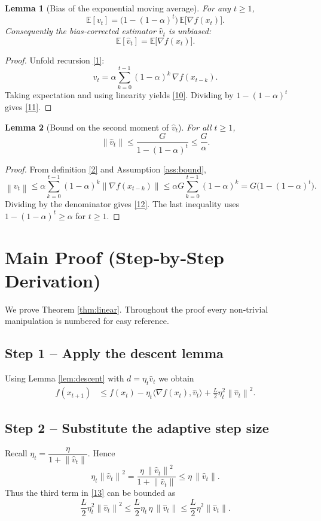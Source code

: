 \documentclass{article}
\newtheorem{lemma}{Lemma}
\newcommand{\EE}{\mathbb{E}}
\newcommand{\norm}[1]{\left\|#1\right\|}
\newcommand{\inner}[2]{\langle #1,#2\rangle}
\newcommand{\grad}{\nabla}
\begin{document}
\begin{lemma}[Bias of the exponential moving average]\label{lem:bias}
For any $t\ge1$,
\[
\EE[v_{t}] = \bigl(1-(1-\alpha)^{t}\bigr)\,\EE\!\bigl[\grad f(x_{t})\bigr].
\tag{10}
\]
Consequently the bias‑corrected estimator $\hat v_{t}$ is unbiased:
\[
\EE[\hat v_{t}] = \EE\!\bigl[\grad f(x_{t})\bigr].
\tag{11}
\]
\end{lemma}
\begin{proof}
Unfold recursion \eqref{1}:
\[
v_{t}= \alpha\sum_{k=0}^{t-1}(1-\alpha)^{k}\,\grad f(x_{t-k}).
\]
Taking expectation and using linearity yields \eqref{10}. Dividing by
$1-(1-\alpha)^{t}$ gives \eqref{11}.
\end{proof}

\begin{lemma}[Bound on the second moment of $\hat v_{t}$]\label{lem:second}
For all $t\ge1$,
\[
\norm{\hat v_{t}} \le \frac{G}{1-(1-\alpha)^{t}}\le \frac{G}{\alpha}.
\tag{12}
\]
\end{lemma}
\begin{proof}
From definition \eqref{2} and Assumption \ref{ass:bound},
\[
\norm{v_{t}}\le \alpha\sum_{k=0}^{t-1}(1-\alpha)^{k}\norm{\grad f(x_{t-k})}
\le \alpha G\sum_{k=0}^{t-1}(1-\alpha)^{k}
= G\bigl(1-(1-\alpha)^{t}\bigr).
\]
Dividing by the denominator gives \eqref{12}. The last inequality uses
$1-(1-\alpha)^{t}\ge\alpha$ for $t\ge1$.
\end{proof}

\section*{Main Proof (Step‑by‑Step Derivation)}
We prove Theorem \ref{thm:linear}.  Throughout the proof every non‑trivial
manipulation is numbered for easy reference.

\subsection*{Step 1 – Apply the descent lemma}
Using Lemma \ref{lem:descent} with $d=\eta_{t}\hat v_{t}$ we obtain
\[
\begin{aligned}
f(x_{t+1})
&\le f(x_{t})-\eta_{t}\inner{\grad f(x_{t})}{\hat v_{t}}
    +\frac{L}{2}\eta_{t}^{2}\norm{\hat v_{t}}^{2}.
\tag{13}
\end{aligned}
\]

\subsection*{Step 2 – Substitute the adaptive step size}
Recall $\eta_{t}= \dfrac{\eta}{1+\norm{\hat v_{t}}}$.  Hence
\[
\eta_{t}\norm{\hat v_{t}}^{2}
= \frac{\eta\,\norm{\hat v_{t}}^{2}}{1+\norm{\hat v_{t}}}
\le \eta\,\norm{\hat v_{t}}. \tag{14}
\]
Thus the third term in \eqref{13} can be bounded as
\[
\frac{L}{2}\eta_{t}^{2}\norm{\hat v_{t}}^{2}
\le \frac{L}{2}\eta_{t}\,\eta\,\norm{\hat v_{t}}
\le \frac{L}{2}\eta^{2}\norm{\hat v_{t}}.
\tag{15}
\]
\end{document}
